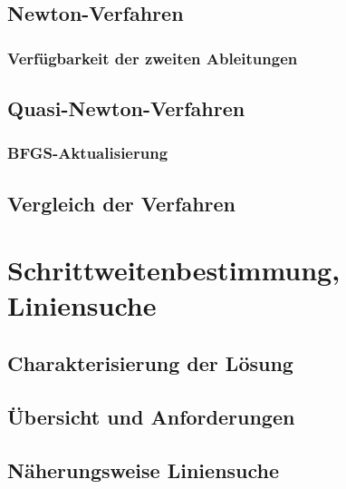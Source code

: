         \subsection{Newton-Verfahren} %

            \subsubsection{Verfügbarkeit der zweiten Ableitungen} %

        \subsection{Quasi-Newton-Verfahren} %

            \subsubsection{BFGS-Aktualisierung} %

        \subsection{Vergleich der Verfahren} %

    \section{Schrittweitenbestimmung, Liniensuche} %

        \subsection{Charakterisierung der Lösung} %

        \subsection{Übersicht und Anforderungen} %

        \subsection{Näherungsweise Liniensuche} %

